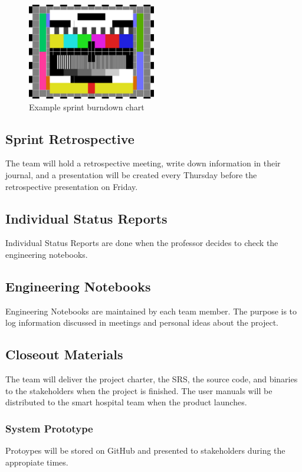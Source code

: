 \begin{figure}[h!]
    \centering
    \includegraphics[width=0.5\textwidth]{images/test_image}
    \caption{Example sprint burndown chart}
\end{figure}

\subsection{Sprint Retrospective}
The team will hold a retrospective meeting, write down information in their journal, and a presentation will be created every Thursday before the retrospective presentation on Friday.

\subsection{Individual Status Reports}
Individual Status Reports are done when the professor decides to check the engineering notebooks.

\subsection{Engineering Notebooks}
Engineering Notebooks are maintained by each team member. The purpose is to log information discussed in meetings and personal ideas about the project.

\subsection{Closeout Materials}
The team will deliver the project charter, the SRS, the source code, and binaries to the stakeholders when the project is finished. The user manuals will be distributed to the smart hospital team when the product launches.

\subsubsection{System Prototype}
Protoypes will be stored on GitHub and presented to stakeholders during the appropiate times.

